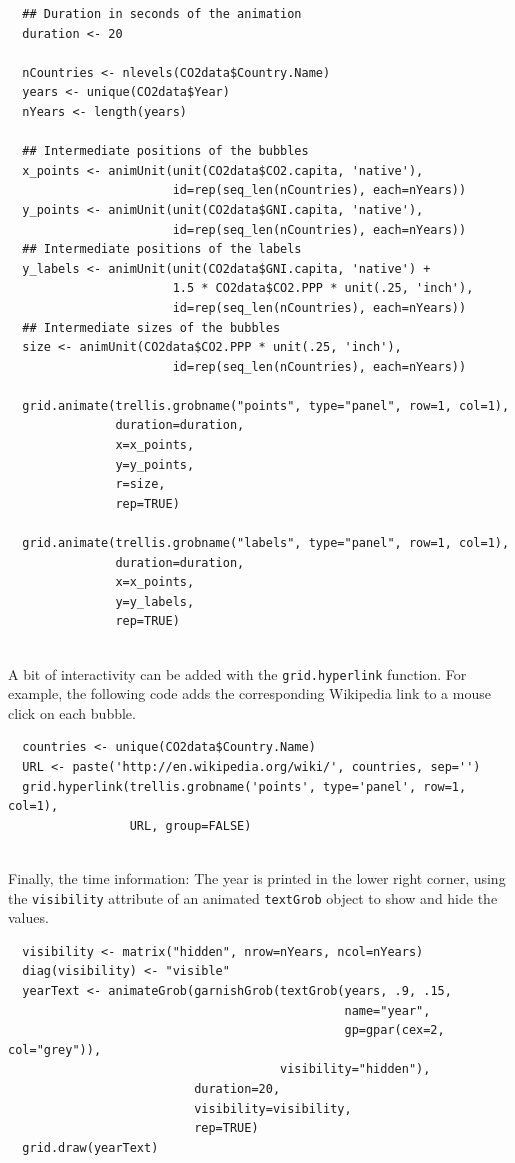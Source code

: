 \lstset{language=r,label= ,caption= ,captionpos=b,numbers=none}
\begin{lstlisting}
  ## Duration in seconds of the animation
  duration <- 20
  
  nCountries <- nlevels(CO2data$Country.Name)
  years <- unique(CO2data$Year)
  nYears <- length(years)
  
  ## Intermediate positions of the bubbles
  x_points <- animUnit(unit(CO2data$CO2.capita, 'native'),
                       id=rep(seq_len(nCountries), each=nYears))
  y_points <- animUnit(unit(CO2data$GNI.capita, 'native'),
                       id=rep(seq_len(nCountries), each=nYears))
  ## Intermediate positions of the labels
  y_labels <- animUnit(unit(CO2data$GNI.capita, 'native') +
                       1.5 * CO2data$CO2.PPP * unit(.25, 'inch'),
                       id=rep(seq_len(nCountries), each=nYears))
  ## Intermediate sizes of the bubbles
  size <- animUnit(CO2data$CO2.PPP * unit(.25, 'inch'),
                       id=rep(seq_len(nCountries), each=nYears))
  
  grid.animate(trellis.grobname("points", type="panel", row=1, col=1),
               duration=duration,
               x=x_points,
               y=y_points,
               r=size,
               rep=TRUE)
  
  grid.animate(trellis.grobname("labels", type="panel", row=1, col=1),
               duration=duration,
               x=x_points,
               y=y_labels,
               rep=TRUE)
  
\end{lstlisting}

A bit of interactivity can be added with the \texttt{grid.hyperlink}
function. For example, the following code adds the corresponding
Wikipedia link to a mouse click on each bubble.


\lstset{language=r,label= ,caption= ,captionpos=b,numbers=none}
\begin{lstlisting}
  countries <- unique(CO2data$Country.Name)
  URL <- paste('http://en.wikipedia.org/wiki/', countries, sep='')
  grid.hyperlink(trellis.grobname('points', type='panel', row=1, col=1),
                 URL, group=FALSE)
  
\end{lstlisting}

Finally, the time information: The year is printed in the lower
right corner, using the \texttt{visibility} attribute of an animated
\texttt{textGrob} object to show and hide the values.
\lstset{language=r,label= ,caption= ,captionpos=b,numbers=none}
\begin{lstlisting}
  visibility <- matrix("hidden", nrow=nYears, ncol=nYears)
  diag(visibility) <- "visible"
  yearText <- animateGrob(garnishGrob(textGrob(years, .9, .15,
                                               name="year",
                                               gp=gpar(cex=2, col="grey")),
                                      visibility="hidden"),
                          duration=20,
                          visibility=visibility,
                          rep=TRUE)
  grid.draw(yearText)
\end{lstlisting}

